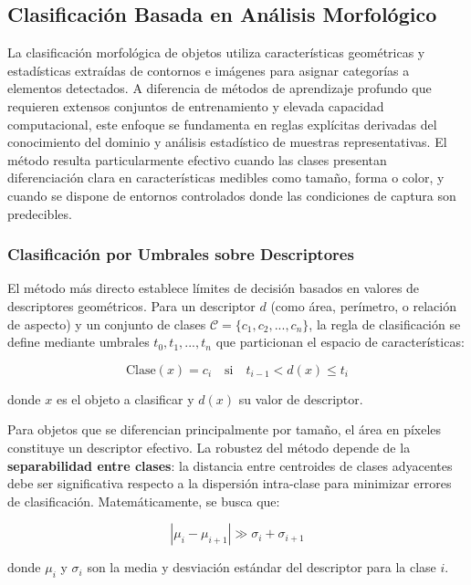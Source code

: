 \subsection{Clasificación Basada en Análisis Morfológico}

La clasificación morfológica de objetos utiliza características geométricas y estadísticas extraídas de contornos e imágenes para asignar categorías a elementos detectados. A diferencia de métodos de aprendizaje profundo que requieren extensos conjuntos de entrenamiento y elevada capacidad computacional, este enfoque se fundamenta en reglas explícitas derivadas del conocimiento del dominio y análisis estadístico de muestras representativas. El método resulta particularmente efectivo cuando las clases presentan diferenciación clara en características medibles como tamaño, forma o color, y cuando se dispone de entornos controlados donde las condiciones de captura son predecibles.

\subsubsection{Clasificación por Umbrales sobre Descriptores}

El método más directo establece límites de decisión basados en valores de descriptores geométricos. Para un descriptor $d$ (como área, perímetro, o relación de aspecto) y un conjunto de clases $\mathcal{C} = \{c_1, c_2, ..., c_n\}$, la regla de clasificación se define mediante umbrales $t_0, t_1, ..., t_n$ que particionan el espacio de características:

\begin{equation}
\text{Clase}(x) = c_i \quad \text{si} \quad t_{i-1} < d(x) \leq t_i
\end{equation}

donde $x$ es el objeto a clasificar y $d(x)$ su valor de descriptor.

Para objetos que se diferencian principalmente por tamaño, el área en píxeles constituye un descriptor efectivo. La robustez del método depende de la \textbf{separabilidad entre clases}: la distancia entre centroides de clases adyacentes debe ser significativa respecto a la dispersión intra-clase para minimizar errores de clasificación. Matemáticamente, se busca que:

\begin{equation}
|\mu_i - \mu_{i+1}| \gg \sigma_i + \sigma_{i+1}
\end{equation}

donde $\mu_i$ y $\sigma_i$ son la media y desviación estándar del descriptor para la clase $i$.

